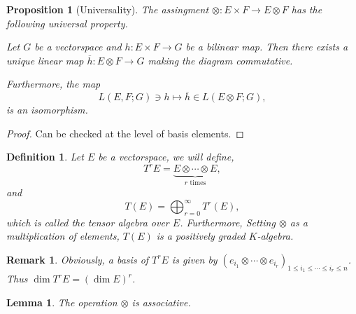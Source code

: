 \documentclass[8pt]{article}
\newtheorem{proposition}{Proposition}[section]
\newtheorem{definition}{Definition}[section]
\newtheorem{lemma}{Lemma}[section]
\newtheorem{remark}{Remark}[section]
\begin{document}
\begin{proposition}[Universality]
  \label{proposition_10_3}
  The assingment $\otimes :E\times F\to E\otimes F$ has the following universal property.
  \par Let $G$ be a vectorspace and $h:E\times F\to G$ be a bilinear map. Then there exists a unique linear map $\overline{h}:E\otimes F\to G$ making the diagram commutative.
  \begin{center}
  \end{center}
  Furthermore, the map 
  \begin{equation*}
    L(E,F;G)\ni h\mapsto \overline{h}\in L(E\otimes F;G),
  \end{equation*}
  is an isomorphism.
\end{proposition}
\begin{proof}
  Can be checked at the level of basis elements.
\end{proof}
\begin{definition}
  Let $E$ be a vectorspace, we will define,
  \begin{equation*}
    T^rE = \underbrace{E\otimes\cdots\otimes E}_{\text{$r$ times}},
  \end{equation*}
  and 
  \begin{equation*}
    T(E) = \bigoplus_{r=0}^\infty T^r(E),
  \end{equation*}
  which is called the tensor algebra over $E$. Furthermore, Setting $\otimes$ as a multiplication of elements, $T(E)$ is a positively graded $K$-algebra. 
\end{definition}
\begin{remark}
  Obviously, a basis of $T^rE$ is given by $(e_{i_1}\otimes \cdots\otimes e_{i_r})_{1\leq i_1\leq\cdots\leq i_r\leq n}$. Thus $\dim T^rE = (\dim E)^r$.
\end{remark}

\begin{lemma}
  The operation $\otimes$ is associative.
  \begin{center}
  \end{center}
\end{lemma}
\end{document}
